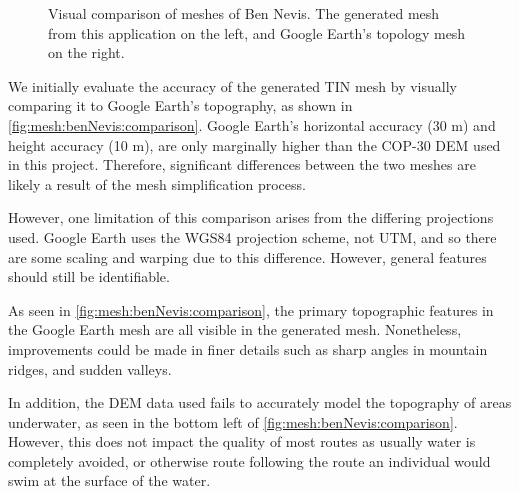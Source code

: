 \documentclass[12pt]{article}
\begin{document}
\begin{figure}[H]
  \centering
  \caption{Visual comparison of meshes of Ben Nevis. The generated mesh from this application on the left, and Google Earth's topology mesh on the right.}\label{fig:mesh:benNevis:comparison}
\end{figure}

We initially evaluate the accuracy of the generated TIN mesh by visually comparing it to Google Earth's topography, as shown in \autoref{fig:mesh:benNevis:comparison}. Google Earth's horizontal accuracy (30 m) and height accuracy (10 m), are only marginally higher than the COP-30 DEM used in this project. Therefore, significant differences between the two meshes are likely a result of the mesh simplification process.

However, one limitation of this comparison arises from the differing projections used. Google Earth uses the WGS84 projection scheme, not UTM, and so there are some scaling and warping due to this difference. However, general features should still be identifiable.

As seen in \autoref{fig:mesh:benNevis:comparison}, the primary topographic features in the Google Earth mesh are all visible in the generated mesh. Nonetheless, improvements could be made in finer details such as sharp angles in mountain ridges, and sudden valleys.

In addition, the DEM data used fails to accurately model the topography of areas underwater, as seen in the bottom left of \autoref{fig:mesh:benNevis:comparison}. However, this does not impact the quality of most routes as usually water is completely avoided, or otherwise route following the route an individual would swim at the surface of the water.
\end{document}
